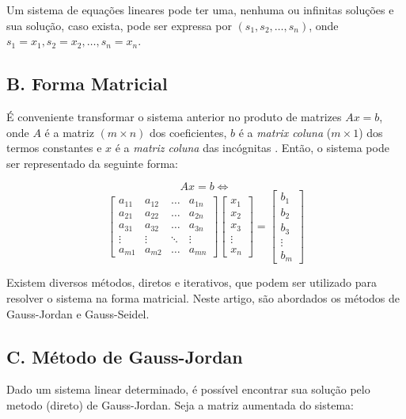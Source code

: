 \documentclass[twocolumn, 10pt]{extarticle}
\begin{document}
Um sistema de equações lineares pode ter uma, nenhuma ou infinitas soluções \cite[p. 4]{antonAlgebra} e sua solução, caso exista, pode ser expressa por $(s_1, s_2,\dots, s_n)$, onde $s_1 = x_1, s_2 = x_2, \dots, s_n = x_n$.

\subsection*{B. \quad Forma Matricial}

É conveniente transformar o sistema anterior no produto de matrizes $Ax = b$, onde $A$ é a matriz $(m \times n)$ dos coeficientes, $b$ é a \textit{matrix coluna} ($m \times 1$) dos termos constantes e $x$ é a \textit{matriz coluna} das incógnitas \cite[p. 33]{antonAlgebra}. Então, o sistema pode ser representado da seguinte forma:

\[Ax = b \iff\]
\[ 
\begin{bmatrix}
a_{11} & a_{12} & \dots & a_{1n} \\
a_{21} & a_{22} & \dots & a_{2n} \\
a_{31} & a_{32} & \dots & a_{3n} \\
\vdots & \vdots & \ddots & \vdots \\
a_{m1} & a_{m2} & \dots & a_{mn}  
\end{bmatrix}
\begin{bmatrix}
x_{1}\\
x_{2}\\
x_{3}\\
\vdots\\
x_{n}
\end{bmatrix}
=
\begin{bmatrix}
b_{1}\\
b_{2}\\
b_{3}\\
\vdots\\
b_{m}
\end{bmatrix}
\]

Existem diversos métodos, diretos e iterativos, que podem ser utilizado para resolver o sistema na forma matricial. Neste artigo, são abordados os métodos de Gauss-Jordan e Gauss-Seidel.

\subsection*{C. \quad Método de Gauss-Jordan}

Dado um sistema linear determinado, é possível encontrar sua solução pelo metodo (direto) de Gauss-Jordan. Seja a matriz aumentada do sistema:
\end{document}
